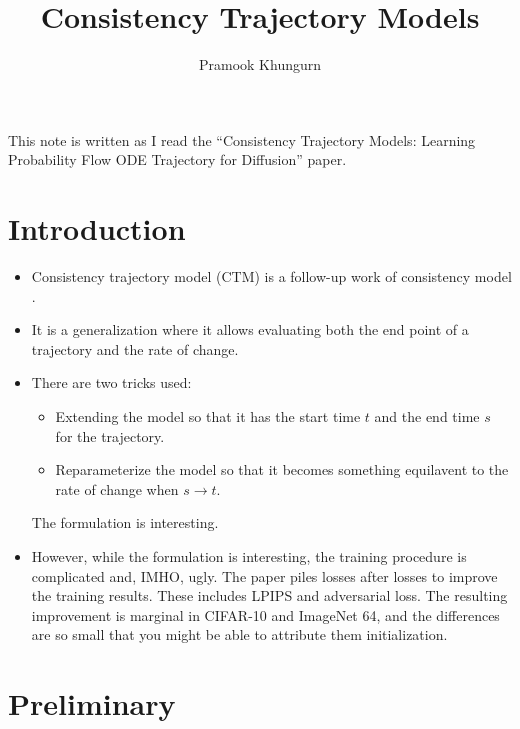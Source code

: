 \documentclass[10pt]{article}
\title{Consistency Trajectory Models}
\author{Pramook Khungurn}
\begin{document}
\maketitle

This note is written as I read the ``Consistency Trajectory Models: Learning Probability Flow ODE Trajectory for Diffusion'' \cite{Kim:2023} paper.

\section{Introduction}

\begin{itemize}
  \item Consistency trajectory model (CTM) is a follow-up work of consistency model \cite{Song:2023}.
  
  \item It is a generalization where it allows evaluating both the end point of a trajectory and the rate of change.
  
  \item There are two tricks used:
  \begin{itemize}
    \item Extending the model so that it has the start time $t$ and the end time $s$ for the trajectory.
    \item Reparameterize the model so that it becomes something equilavent to the rate of change when $s \rightarrow t$.
  \end{itemize}
  The formulation is interesting.
  
  \item However, while the formulation is interesting, the training procedure is complicated and, IMHO, ugly. The paper piles losses after losses to improve the training results. These includes LPIPS and adversarial loss. The resulting improvement is marginal in CIFAR-10 and ImageNet 64, and the differences are so small that you might be able to attribute them initialization.
\end{itemize}

\section{Preliminary}
\end{document}
